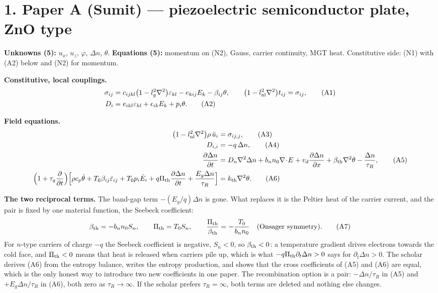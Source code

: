 \documentclass[11pt]{article}
\begin{document}
\section*{1. Paper A (Sumit) --- piezoelectric semiconductor plate, ZnO type}

\noindent\textbf{Unknowns (5):} $u_x$, $u_z$, $\varphi$, $\Delta n$, $\theta$. \quad
\textbf{Equations (5):} momentum on (N2), Gauss, carrier continuity, MGT heat.
Constitutive side: (N1) with (A2) below and (N2) for momentum.

\noindent\textbf{Constitutive, local couplings.}
\begin{align}
\sigma_{ij}&=c_{ijkl}\bigl(1-l_g^2\nabla^2\bigr)\varepsilon_{kl}-e_{kij}E_k-\beta_{ij}\theta,
\qquad \bigl(1-l_{\rm nl}^2\nabla^2\bigr)t_{ij}=\sigma_{ij}, \tag{A1}\\
D_i&=e_{ikl}\varepsilon_{kl}+\epsilon_{ik}E_k+p_i\theta . \tag{A2}
\end{align}

\noindent\textbf{Field equations.}
\begin{align}
\bigl(1-l_{\rm nl}^2\nabla^2\bigr)\rho\,\ddot u_i&=\sigma_{ij,j}, \tag{A3}\\
D_{i,i}&=-q\,\Delta n, \tag{A4}\\
\frac{\partial\Delta n}{\partial t}&=D_n\nabla^2\Delta n+b_nn_0\nabla\!\cdot\!E
+v_d\frac{\partial\Delta n}{\partial x}+\beta_{\rm th}\nabla^2\theta-\frac{\Delta n}{\tau_R}, \tag{A5}\\
\Bigl(1+\tau_q\frac{\partial}{\partial t}\Bigr)
\Bigl[\rho c_p\dot\theta+T_0\beta_{ij}\dot\varepsilon_{ij}
+T_0p_i\dot E_i+q\Pi_{\rm th}\frac{\partial\Delta n}{\partial t}
+\frac{E_g\Delta n}{\tau_R}\Bigr]&=k_{\rm th}\nabla^2\theta . \tag{A6}
\end{align}

\noindent\textbf{The two reciprocal terms.} The band-gap term $-(E_g/q)\dot{\Delta n}$ is gone. What
replaces it is the Peltier heat of the carrier current, and the pair is fixed by one material function,
the Seebeck coefficient:
\begin{equation}
\beta_{\rm th}=-b_nn_0S_n,\qquad \Pi_{\rm th}=T_0S_n,\qquad
\frac{\Pi_{\rm th}}{\beta_{\rm th}}=-\frac{T_0}{b_nn_0}\quad\text{(Onsager symmetry).}
\tag{A7}
\end{equation}
For $n$-type carriers of charge $-q$ the Seebeck coefficient is negative, $S_n<0$, so
$\beta_{\rm th}<0$: a temperature gradient drives electrons towards the cold face, and $\Pi_{\rm th}<0$
means that heat is released when carriers pile up, which is what $-q\Pi_{\rm th}\partial_t\Delta n>0$
says for $\partial_t\Delta n>0$. The scholar derives (A6) from the entropy balance, writes the entropy
production, and shows that the cross coefficients of (A5) and (A6) are equal, which is the only honest
way to introduce two new coefficients in one paper. The recombination option is a pair: $-\Delta n/\tau_R$
in (A5) and $+E_g\Delta n/\tau_R$ in (A6), both zero as $\tau_R\to\infty$. If the scholar prefers
$\tau_R=\infty$, both terms are deleted and nothing else changes.
\end{document}
